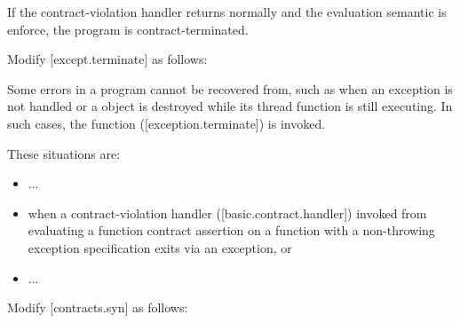 \begin{adjustwidth}{0.5cm}{0.5cm}

If the contract-violation handler returns normally and the evaluation semantic is enforce,
the program is contract-terminated.

\end{adjustwidth}

Modify [except.terminate] as follows:

\begin{adjustwidth}{0.5cm}{0.5cm}
Some errors in a program cannot be recovered from, such as when an exception is not
handled or a  object is destroyed while its thread function is still executing.
In such cases, the function  ([exception.terminate]) is invoked. 
\begin{note}
These situations are:
\begin{itemize}
\item ...
\item when  a contract-violation handler ([basic.contract.handler]) invoked from evaluating a function contract assertion on a function with a non-throwing exception specification exits via an exception, or
\item ...
\end{itemize}
\end{note}
\end{adjustwidth}

Modify [contracts.syn] as follows:

